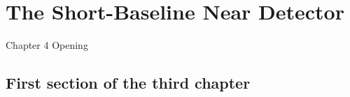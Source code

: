 \chapter{The Short-Baseline Near Detector}

\ifpdf
    \graphicspath{{Chapter4/Figs/Raster/}{Chapter4/Figs/PDF/}{Chapter4/Figs/}}
\else
    \graphicspath{{Chapter4/Figs/Vector/}{Chapter4/Figs/}}
\fi


Chapter 4 Opening


\section{First section of the third chapter}
